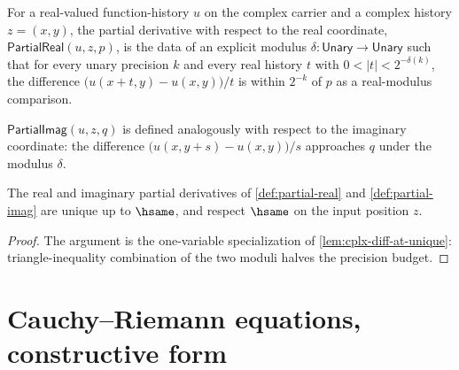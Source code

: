 \begin{definition}
\label{def:partial-real}
For a real-valued function-history \(u\) on the complex carrier and a complex history \(z = (x, y)\), the partial derivative with respect to the real coordinate, \(\mathsf{PartialReal}(u, z, p)\), is the data of an explicit modulus \(\delta : \mathsf{Unary} \to \mathsf{Unary}\) such that for every unary precision \(k\) and every real history \(t\) with \(0 < |t| < 2^{-\delta(k)}\), the difference \(\bigl(u(x + t, y) - u(x, y)\bigr)/t\) is within \(2^{-k}\) of \(p\) as a real-modulus comparison.
\end{definition}

\begin{definition}
\label{def:partial-imag}
\(\mathsf{PartialImag}(u, z, q)\) is defined analogously with respect to the imaginary coordinate: the difference \(\bigl(u(x, y + s) - u(x, y)\bigr)/s\) approaches \(q\) under the modulus \(\delta\).
\end{definition}

\begin{lemma}
\label{lem:partial-unique}
The real and imaginary partial derivatives of \autoref{def:partial-real} and \autoref{def:partial-imag} are unique up to \(\hsame\), and respect \(\hsame\) on the input position \(z\).
\end{lemma}
\begin{proof}
The argument is the one-variable specialization of \autoref{lem:cplx-diff-at-unique}: triangle-inequality combination of the two moduli halves the precision budget.
\end{proof}

\section{Cauchy--Riemann equations, constructive form}

